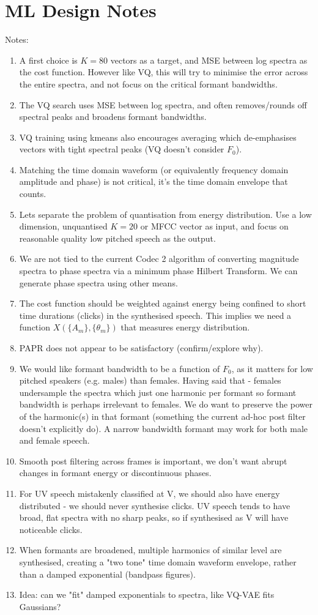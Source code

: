 \documentclass{article}
\begin{document}
\section{ML Design Notes}

Notes:
\begin{enumerate}
\item A first choice is $K=80$ vectors as a target, and MSE between log spectra as the cost function.  However like VQ, this will try to minimise the error across the entire spectra, and not focus on the critical formant bandwidths.
\item The VQ search uses MSE between log spectra, and often removes/rounds off spectral peaks and broadens formant bandwidths.  
\item VQ training using kmeans also encourages averaging which de-emphasises vectors with tight spectral peaks (VQ doesn't consider $F_0$).
\item Matching the time domain waveform (or equivalently frequency domain amplitude and phase) is not critical, it's the time domain envelope that counts.
\item Lets separate the problem of quantisation from energy distribution.  Use a low dimension, unquantised $K=20$ or MFCC vector as input, and focus on reasonable quality low pitched speech as the output.
\item We are not tied to the current Codec 2 algorithm of converting magnitude spectra to phase spectra via a minimum phase Hilbert Transform.  We can generate phase spectra using other means.
\item The cost function should be weighted against energy being confined to short time durations (clicks) in the synthesised speech.  This implies we need a function $X(\{A_m\},\{\theta_m\})$ that measures energy distribution.
\item PAPR does not appear to be satisfactory (confirm/explore why).
\item We would like formant bandwidth to be a function of $F_0$, as it matters for low pitched speakers (e.g. males) than females.  Having said that - females undersample the spectra which just one harmonic per formant so formant bandwidth is perhaps irrelevant to females.  We do want to preserve the power of the harmonic(s) in that formant (something the current ad-hoc post filter doesn't explicitly do).  A narrow bandwidth formant may work for both male and female speech.
\item Smooth post filtering across frames is important, we don't want abrupt changes in formant energy or discontinuous phases.
\item For UV speech mistakenly classified at V, we should also have energy distributed - we should never synthesise clicks.  UV speech tends to have broad, flat spectra with no sharp peaks, so if synthesised as V will have noticeable clicks.
\item When formants are broadened, multiple harmonics of similar level are synthesised, creating a "two tone" time domain waveform envelope, rather than a damped exponential (bandpass figures).
\item Idea: can we "fit" damped exponentials to spectra, like VQ-VAE fits Gaussians?
\end{enumerate}
\end{document}
